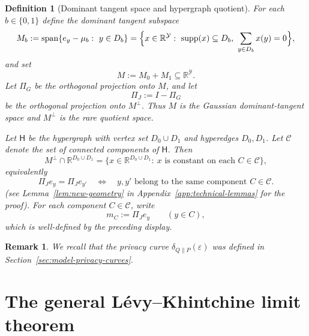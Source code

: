 \documentclass{article}
\newtheorem{definition}[theorem]{Definition}
\newtheorem{remark}[theorem]{Remark}
\newcommand{\1}{\mathbf 1}
\begin{document}
\begin{definition}[Dominant tangent space and hypergraph quotient]
\label{def:dominant-tangent-quotient}
For each $b\in\{0,1\}$ define the dominant tangent subspace
\[
M_b
:=\mathrm{span}\{e_y-\mu_b:\ y\in D_b\}
=
\Bigl\{x\in\mathbb R^{\mathcal Y}:\ \mathrm{supp}(x)\subseteq D_b,\ \sum_{y\in D_b}x(y)=0\Bigr\},
\]
and set
\[
M:=M_0+M_1\subseteq \mathbb R^{\mathcal Y}.
\]
Let $\Pi_G$ be the orthogonal projection onto $M$, and let
\[
\Pi_J:=I-\Pi_G
\]
be the orthogonal projection onto $M^\perp$.
Thus $M$ is the Gaussian dominant-tangent space and $M^\perp$ is the rare quotient space.

Let $\mathsf H$ be the hypergraph with vertex set $D_0\cup D_1$ and hyperedges $D_0,D_1$.
Let $\mathcal C$ denote the set of connected components of $\mathsf H$.
Then
\[
M^\perp\cap \mathbb R^{D_0\cup D_1}
=
\{x\in \mathbb R^{D_0\cup D_1}:\ x \text{ is constant on each } C\in\mathcal C\},
\]
equivalently
\[
\Pi_J e_y=\Pi_J e_{y'}
\quad\Longleftrightarrow\quad
y,y' \text{ belong to the same component } C\in\mathcal C.
\]
(see Lemma~\ref{lem:new-geometry} in Appendix~\ref{app:technical-lemmas} for the proof).
For each component $C\in\mathcal C$, write
\[
m_C:=\Pi_J e_y \qquad (y\in C),
\]
which is well-defined by the preceding display.
\end{definition}

\begin{remark}
We recall that the privacy curve $\delta_{Q\|P}(\varepsilon)$ was defined in
Section~\ref{sec:model-privacy-curves}.
\end{remark}

\section{The general L\'evy--Khintchine limit theorem}
\end{document}

